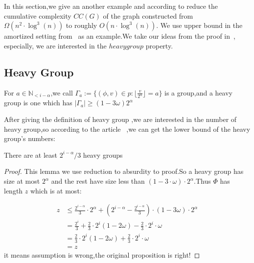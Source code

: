 In this section,we give an another example and according to reduce the cumulative complexity $CC(G)$ of the graph constructed from $\Omega(n^2 \cdot \log^3(n))$ to roughly $O(n \cdot \log^3(n))$. We use upper bound in the amortized setting from ~\cite{alwen2015high}as an example.We take our ideas from the proof in~\cite{alwen2015high}, especially, we are interested in the $heavy group$ property.

\subsection{Heavy Group}
\begin{definition}\label{def::heavygroup}
  For $a\in \mathbb N_{<i-\alpha}$,we call $\Gamma_a :=\{(\phi,v)\in p:\lfloor \frac{v}{2^{\alpha}} \rfloor = a \}$ is a group,and a heavy group is one which has $|\Gamma_a|\ge(1-3\omega)2^{\alpha}$
\end{definition}

 After giving the definition of heavy group ,we are interested in the number of heavy group,so according to the article ~\cite{alwen2015high},we can get the lower bound of the heavy group's numbers:

\begin{lemma}\label{lemma::heavygroup}
  There are at least $2^{i-\alpha}/3$ heavy groups
\end{lemma}

\begin{proof}
  This lemma we use reduction to absurdity to proof.So a heavy group has size at most $2^{\alpha}$ and the rest have size less than $(1-3\cdot\omega)\cdot2^{\alpha}$.Thus $\Phi$ has length $z$ which is at most:

  \begin{equation}
  \begin{aligned}
    z&\le \frac{2^{i-\alpha}}{3}\cdot2^{\alpha}+(2^{i-\alpha}-\frac{2^{i-\alpha}}{3})\cdot(1-3\omega)\cdot2^{\alpha}\\
    &=\frac{2^i}{3}+\frac{2}{3}\cdot2^i(1-2\omega)-\frac{2}{3}\cdot2^i\cdot{\omega}\\
    &=\frac{2}{3}\cdot2^i(1-2\omega)+\frac{2}{3}\cdot2^i\cdot{\omega}\\
    &=z
  \end{aligned}
  \end{equation}
  it means assumption is wrong,the original proposition is right!
\end{proof}

